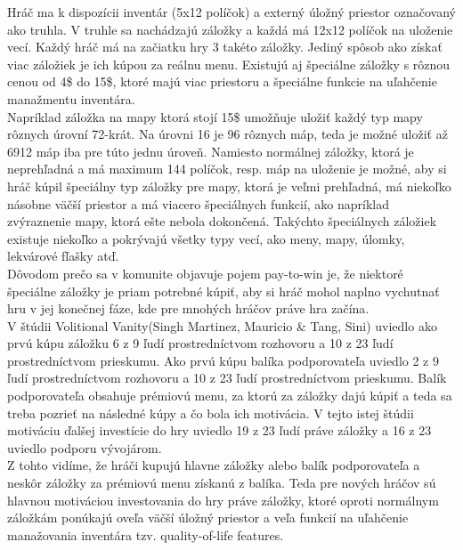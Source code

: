 \documentclass[10pt,twoside,slovak,a4paper]{article}
\begin{document}
Hráč ma k dispozícii inventár (5x12 políčok) a externý úložný priestor označovaný ako truhla. V truhle sa nachádzajú záložky a každá má 12x12 políčok na uloženie vecí. Každý hráč má na začiatku hry 3 takéto záložky. Jediný spôsob ako získať viac záložiek je ich kúpou za reálnu menu. Existujú aj špeciálne záložky s rôznou cenou od 4\$ do 15\$\cite{PoE-shop-stash-tabs}, ktoré majú viac priestoru a špeciálne funkcie na uľahčenie manažmentu inventára.\\

Napríklad záložka na mapy ktorá stojí 15\$ umožňuje uložiť každý typ mapy rôznych úrovní 72-krát. Na úrovni 16 je 96 rôznych máp, teda je možné uložiť až 6912 máp iba pre túto jednu úroveň. Namiesto normálnej záložky, ktorá je neprehľadná a má maximum 144 políčok, resp. máp na uloženie je možné, aby si hráč kúpil špeciálny typ záložky pre mapy, ktorá je veľmi prehľadná, má niekoľko násobne väčší priestor a má viacero špeciálnych funkcií, ako napríklad zvýraznenie mapy, ktorá ešte nebola dokončená. Takýchto špeciálnych záložiek existuje niekoľko a pokrývajú všetky typy vecí, ako meny, mapy, úlomky, lekvárové fľašky atď.\\

Dôvodom prečo sa v komunite objavuje pojem pay-to-win je, že niektoré špeciálne záložky je priam potrebné kúpiť, aby si hráč mohol naplno vychutnať hru v jej konečnej fáze, kde pre mnohých hráčov práve hra začína.\\

V štúdii Volitional Vanity(Singh Martinez, Mauricio \& Tang, Sini)\cite{Volitional-Vanity} uviedlo ako prvú kúpu záložku 6 z 9 ľudí prostredníctvom rozhovoru a 10 z 23 ľudí prostredníctvom prieskumu. Ako prvú kúpu balíka podporovateľa uviedlo 2 z 9 ľudí prostredníctvom rozhovoru a 10 z 23 ľudí prostredníctvom prieskumu. Balík podporovateľa obsahuje prémiovú menu, za ktorú za záložky dajú kúpiť a teda sa treba pozrieť na následné kúpy a čo bola ich motivácia. V tejto istej štúdii motiváciu ďalšej investície do hry uviedlo 19 z 23 ľudí práve záložky a 16 z 23 uviedlo podporu vývojárom.\\

Z tohto vidíme, že hráči kupujú hlavne záložky alebo balík podporovateľa a neskôr záložky za prémiovú menu získanú z balíka. Teda pre nových hráčov sú hlavnou motiváciou investovania do hry práve záložky, ktoré oproti normálnym záložkám ponúkajú oveľa väčší úložný priestor a veľa funkcií na uľahčenie manažovania inventára tzv. quality-of-life features.\\
\end{document}
